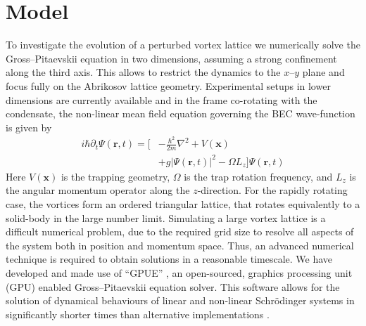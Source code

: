 \section{Model}\label{sec:model}

To investigate the evolution of a perturbed vortex lattice we numerically solve the Gross--Pitaevskii equation in two dimensions, assuming a strong confinement along the third axis. This allows to restrict the dynamics to the $x$--$y$ plane and focus fully on the Abrikosov lattice geometry. Experimental setups in lower dimensions are currently available \cite{BEC:Stock_lpl_2004,BEC:Seo_jkps_2014,BEC:Chomaz_natcom_2015} and in the frame co-rotating with the condensate, the non-linear mean field equation governing the BEC wave-function is given by
\begin{align}
i\hbar\partial_t \Psi(\mathbf{r},t) = \Big[&-\frac{\hbar^2}{2m}\nabla^2 + V\left(\mathbf{x}\right) \nonumber\\
&+ g\vert \Psi(\mathbf{r},t) \vert^2- \Omega L_z \Big]\Psi(\mathbf{r},t)
\end{align}
Here $V\left(\mathbf{x}\right)$ is the trapping geometry, $\Omega$ is the trap rotation frequency, and $L_z$ is the angular momentum operator along the $z$-direction. For the rapidly rotating case, the vortices form an ordered triangular lattice, that rotates equivalently to a solid-body in the large number limit. Simulating a large vortex lattice is a difficult numerical problem, due to the required grid size to resolve all aspects of the system both in position and momentum space. Thus, an advanced numerical technique is required to obtain solutions in a reasonable timescale. We have developed and made use of ``GPUE'' \cite{GPUEDOI}, an open-sourced, graphics processing unit (GPU) enabled Gross--Pitaevskii equation solver. This software allows for the solution of dynamical behaviours of linear and non-linear Schr\"odinger systems in significantly shorter times than alternative implementations \cite{AO:Morgan_pra_2013,Wittekblog_2016}.


